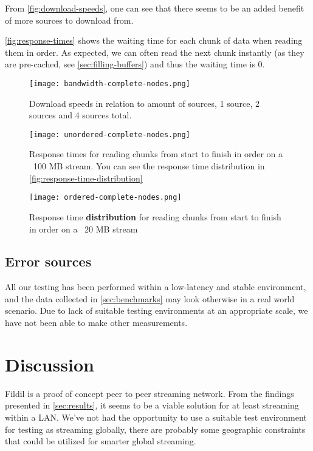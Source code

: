 \documentclass[10pt, a4paper]{article}
\begin{document}
From \autoref{fig:download-speeds}, one can see that there seems to be an added
benefit of more sources to download from.

\autoref{fig:response-times} shows the waiting time for each chunk of data when
reading them in order. As expected, we can often read the next chunk instantly
(as they are pre-cached, see \autoref{sec:filling-buffers}) and thus the waiting
time is 0.

\begin{figure}[H]
\centering
\texttt{[image: bandwidth-complete-nodes.png]}
\caption{Download speeds in relation to amount of sources, 1 source, 2 sources
  and 4 sources total.}
\label{fig:download-speeds}
\end{figure}

\begin{figure}[H]
\centering
\texttt{[image: unordered-complete-nodes.png]}
\caption{Response times for reading chunks from start to finish in order on a
  ~100 MB stream. You can see the response time distribution in
  \autoref{fig:response-time-distribution}}
\label{fig:response-times}
\end{figure}

\begin{figure}[H]
\centering
\texttt{[image: ordered-complete-nodes.png]}
\caption{Response time \textbf{distribution} for reading chunks from start to
  finish in order on a ~20 MB stream}
\label{fig:response-time-distribution}
\end{figure}

\subsection{Error sources}

All our testing has been performed within a low-latency and stable environment,
and the data collected in \autoref{sec:benchmarks} may look otherwise in a real
world scenario. Due to lack of suitable testing environments at an appropriate
scale, we have not been able to make other measurements.

\section{Discussion}
\label{sec:discussion}

Fildil is a proof of concept peer to peer streaming network. From the findings
presented in \autoref{sec:results}, it seems to be a viable solution for at
least streaming within a LAN. We've not had the opportunity to use a suitable
test environment for testing as streaming globally, there are probably some
geographic constraints that could be utilized for smarter global streaming.
\end{document}
